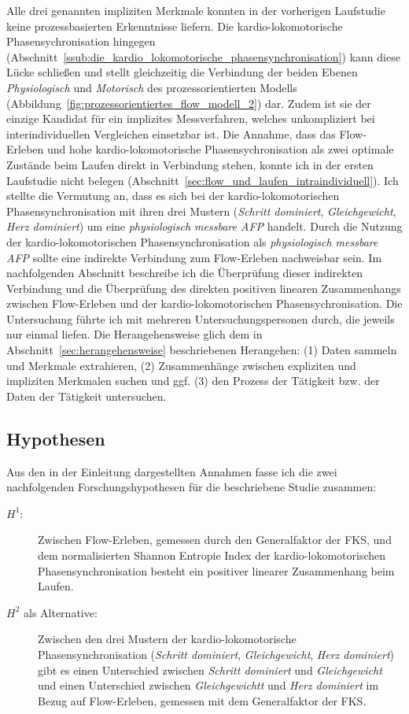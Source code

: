 Alle drei genannten impliziten Merkmale konnten in der vorherigen Laufstudie keine prozessbasierten Erkenntnisse liefern. Die kardio-lokomotorische Phasensychronisation hingegen (Abschnitt~\ref{ssub:die_kardio_lokomotorische_phasensynchronisation}) kann diese Lücke schließen und stellt gleichzeitig die Verbindung der beiden Ebenen \emph{Physiologisch} und \emph{Motorisch} des prozessorientierten Modells (Abbildung~\ref{fig:prozessorientiertes_flow_modell_2}) dar. Zudem ist sie der einzige Kandidat für ein implizites Messverfahren, welches unkompliziert bei interindividuellen Vergleichen einsetzbar ist. Die Annahme, dass das Flow-Erleben und hohe kardio-lokomotorische Phasensychronisation als zwei optimale Zustände beim Laufen direkt in Verbindung stehen, konnte ich in der ersten Laufstudie nicht belegen (Abschnitt~\ref{sec:flow_und_laufen_intraindividuell}). Ich stellte die Vermutung an, dass es sich bei der kardio-lokomotorischen Phasensynchronisation mit ihren drei Mustern (\emph{Schritt dominiert}, \emph{Gleichgewicht}, \emph{Herz dominiert}) um eine \emph{physiologisch messbare \ac{AFP}} handelt. Durch die Nutzung der kardio-lokomotorischen Phasensynchronisation als \emph{physiologisch messbare \ac{AFP}} sollte eine indirekte Verbindung zum Flow-Erleben nachweisbar sein. Im nachfolgenden Abschnitt beschreibe ich die Überprüfung dieser indirekten Verbindung und die Überprüfung des direkten positiven linearen Zusammenhangs zwischen Flow-Erleben und der kardio-lokomotorischen Phasensychronisation. Die Untersuchung führte ich mit mehreren Untersuchungspersonen durch, die jeweils nur einmal liefen. Die Herangehensweise glich dem in Abschnitt~\ref{sec:herangehensweise} beschriebenen Herangehen: (1) Daten sammeln und Merkmale extrahieren, (2) Zusammenhänge zwischen expliziten und impliziten Merkmalen suchen und ggf. (3) den Prozess der Tätigkeit bzw. der Daten der Tätigkeit untersuchen. 

\subsection{Hypothesen} 

\label{sub:hypothesen}

Aus den in der Einleitung dargestellten Annahmen fasse ich die zwei nachfolgenden Forschungshypothesen für die beschriebene Studie zusammen: 
\begin{description}
	\item[$H^1$:] Zwischen Flow-Erleben, gemessen durch den Generalfaktor der \ac{FKS}, und dem normalisierten Shannon Entropie Index der kardio-lokomotorischen Phasensynchronisation besteht ein positiver linearer Zusammenhang beim Laufen. 
	\item[$H^2$ als Alternative:]  Zwischen den drei Mustern der kardio-lokomotorische Phasensynchronisation (\emph{Schritt dominiert}, \emph{Gleichgewicht}, \emph{Herz dominiert}) gibt es einen Unterschied zwischen \emph{Schritt dominiert} und \emph{Gleichgewicht} und einen Unterschied zwischen \emph{Gleichgewichtt} und \emph{Herz dominiert} im Bezug auf Flow-Erleben, gemessen mit dem Generalfaktor der \ac{FKS}. 
\end{description}


